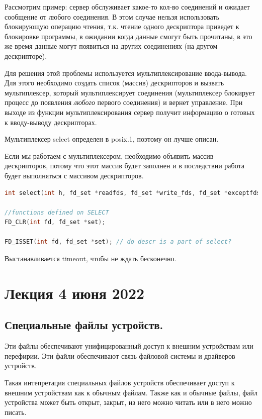 \documentclass[12pt,a4paper]{scrreprt}
\begin{document}
Рассмотрим пример: сервер обслуживает какое-то кол-во соединений и ожидает сообщение от любого соединения. В этом случае нельзя использовать блокирующую операцию чтения, т.к. чтение одного дескриптора приведет к блокировке программы, в ожидании когда данные смогут быть прочитаны, в это же время данные могут появиться на других соединениях (на другом дескрипторе). 

Для решения этой проблемы используется мультиплексирование ввода-вывода. Для этого необходимо создать список (массив) дескрипторов и вызвать мультиплексер, который мультиплексирует соединения (мультиплексер блокирует процесс до появления \textit{любого} первого соединения) и вернет управление. При выходе из функции мультиплексирования сервер получит информацию о готовых к вводу-выводу дескрипторах.

Мультиплексер select определен в posix.1, поэтому он лучше описан.

Если мы работаем с мультиплексером, необходимо объявить массив дескрипторов, потому что этот массив будет заполнен и в последствии работа будет выполняться с массивом дескрипторов.

\begin{lstlisting}[language=C]
int select(int h, fd_set *readfds, fd_set *write_fds, fd_set *exceptfds, struct timeval *timeout);

//functions defined on SELECT
FD_CLR(int fd, fd_set *set);

FD_ISSET(int fd, fd_set *set); // do descr is a part of select?
\end{lstlisting}

Выстанавливается timeout, чтобы не ждать бесконечно.

\chapter{\textbf{Лекция 4 июня 2022}}

\section{Специальные файлы устройств.}

Эти файлы обеспечивают унифицированный доступ к внешним устройствам или перефирии. Эти файли обеспечивают связь файловой системы и драйверов устройств.

Такая интепретация специальных файлов устройств обеспечивает доступ к внешним устройствам как к обычным файлам. Также как и обычные файлы, файл устройства может быть открыт, закрыт, из него можно читать или в него можно писать. 
\end{document}
